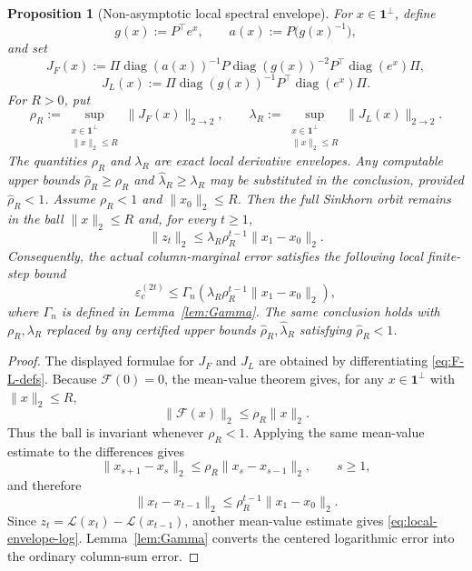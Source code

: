 \documentclass[11pt]{article}
\numberwithin{equation}{section}
\theoremstyle{plain}
\newtheorem{proposition}[theorem]{Proposition}
\theoremstyle{definition}
\theoremstyle{remark}
\newcommand{\ones}{\mathbf{1}}
\newcommand{\diag}{\operatorname{diag}}
\begin{document}
\begin{proposition}[Non-asymptotic local spectral envelope]\label{thm:local-envelope}
For $x\in\ones^\perp$, define
\[
        g(x):=P^\top e^x,
        \qquad
        a(x):=P\big(g(x)^{-1}\big),
\]
and set
\begin{equation}\label{eq:JF-JL}
        J_F(x)
        :=
        \Pi\diag(a(x))^{-1}P\diag(g(x))^{-2}P^\top\diag(e^x)\Pi,
\end{equation}
\begin{equation}\label{eq:JL}
        J_L(x)
        :=
        \Pi\diag(g(x))^{-1}P^\top\diag(e^x)\Pi .
\end{equation}
For $R>0$, put
\begin{equation}\label{eq:rhoR-lambdaR}
        \rho_R
        :=
        \sup_{\substack{x\in\ones^\perp\\ \|x\|_2\le R}}
        \|J_F(x)\|_{2\to2},
        \qquad
        \lambda_R
        :=
        \sup_{\substack{x\in\ones^\perp\\ \|x\|_2\le R}}
        \|J_L(x)\|_{2\to2}.
\end{equation}
The quantities $\rho_R$ and $\lambda_R$ are exact local derivative envelopes. Any computable upper bounds $\widehat\rho_R\ge\rho_R$ and $\widehat\lambda_R\ge\lambda_R$ may be substituted in the conclusion, provided $\widehat\rho_R<1$.
Assume $\rho_R<1$ and $\|x_0\|_2\le R$. Then the full Sinkhorn orbit remains in the ball $\|x\|_2\le R$ and, for every $t\ge1$,
\begin{equation}\label{eq:local-envelope-log}
        \|z_t\|_2
        \le
        \lambda_R\rho_R^{t-1}\|x_1-x_0\|_2 .
\end{equation}
Consequently, the actual column-marginal error satisfies the following local finite-step bound
\begin{equation}\label{eq:local-envelope-eps}
        \varepsilon_c^{(2t)}
        \le
        \Gamma_n\!\left(
        \lambda_R\rho_R^{t-1}\|x_1-x_0\|_2
        \right),
\end{equation}
where $\Gamma_n$ is defined in Lemma~\ref{lem:Gamma}. The same conclusion holds with $\rho_R,\lambda_R$ replaced by any certified upper bounds $\widehat\rho_R,\widehat\lambda_R$ satisfying $\widehat\rho_R<1$.
\end{proposition}

\begin{proof}
The displayed formulae for $J_F$ and $J_L$ are obtained by differentiating \eqref{eq:F-L-defs}. Because $\mathcal F(0)=0$, the mean-value theorem gives, for any $x\in\ones^\perp$ with $\|x\|_2\le R$,
\[
        \|\mathcal F(x)\|_2
        \le
        \rho_R\|x\|_2 .
\]
Thus the ball is invariant whenever $\rho_R<1$. Applying the same mean-value estimate to the differences gives
\[
        \|x_{s+1}-x_s\|_2
        \le
        \rho_R\|x_s-x_{s-1}\|_2,
        \qquad s\ge1,
\]
and therefore
\[
        \|x_t-x_{t-1}\|_2
        \le
        \rho_R^{t-1}\|x_1-x_0\|_2 .
\]
Since $z_t=\mathcal L(x_t)-\mathcal L(x_{t-1})$, another mean-value estimate gives \eqref{eq:local-envelope-log}. Lemma~\ref{lem:Gamma} converts the centered logarithmic error into the ordinary column-sum error.
\end{proof}
\end{document}

